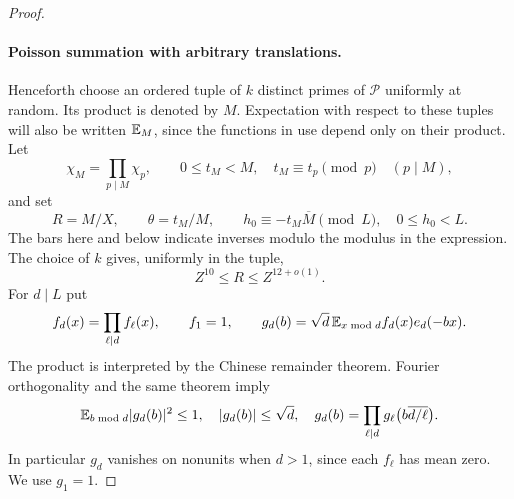 \begin{proof}
\paragraph{Poisson summation with arbitrary translations.}
Henceforth choose an ordered tuple of $k$ distinct primes of
$\mathcal P$ uniformly at random.  Its product is denoted by $M$.
Expectation with respect to these tuples will also be written
$\mathbb E_M$, since the functions in use depend only on their product.
Let
\[
 \chi_M=\prod_{p\mid M}\chi_p,\qquad
 0\leq t_M<M,\quad t_M\equiv t_p\pmod p\quad(p\mid M),
\]
and set
\[
 R=M/X,\qquad \theta=t_M/M,\qquad
 h_0\equiv-t_M\overline M\pmod L,\quad 0\leq h_0<L.
\]
The bars here and below indicate inverses modulo the modulus in the
expression.  The choice of $k$ gives, uniformly in the tuple,
\begin{equation}\label{eq:quad-R-range}
 Z^{10}\leq R\leq Z^{12+o(1)}.
\end{equation}
For $d\mid L$ put
\[
 f_d(x)=\prod_{\ell\mid d}f_\ell(x),\qquad f_1=1,\qquad
 g_d(b)=\sqrt d\,\mathbb E_{x\bmod d} f_d(x)e_d(-bx).
\]
The product is interpreted by the Chinese remainder theorem.  Fourier
orthogonality and the same theorem imply
\begin{equation}\label{eq:quad-g-properties}
 \mathbb E_{b\bmod d}|g_d(b)|^2\leq1,\quad |g_d(b)|\leq\sqrt d,\quad
 g_d(b)=\prod_{\ell\mid d}
              g_\ell\bigl(b\overline{d/\ell}\bigr).
\end{equation}
In particular $g_d$ vanishes on nonunits when $d>1$, since each
$f_\ell$ has mean zero.  We use $g_1=1$.


\end{proof}
